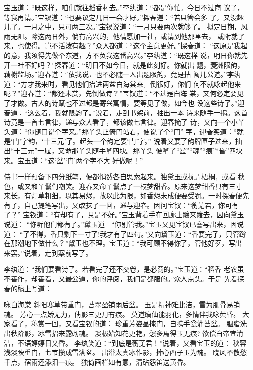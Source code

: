 宝玉道：“既这样，咱们就往稻香村去。”李纨道：“都是你忙。今日不过商
议了，等我再请。”宝钗道：“也要议定几日一会才好。”探春道：“若只管会多
了，又没趣儿了。一月之中，只可两三次。”宝钗说道：“一月只要两次就够了。
拟定日期，风雨无阻。除这两日外，倘有高兴的，他情愿加一社，或请到他那里去，
或附就了来，也使得。岂不活泼有趣？”众人都道：“这个主意更好。”探春道：
“这原是我起的意，我须得先做个东道，方不负我这番高兴。”李纨道：“既这样
说，明日你就先开一社不好吗？”探春道：“明日不如今日，就是此刻好。你就出
题，菱洲限韵，藕榭监场。”迎春道：“依我说，也不必随一人出题限韵，竟是拈
阄儿公道。”李纨道：“方才我来时，看见他们抬进两盆白海棠来，倒很好，你们
何不就咏起他来呢？”迎春道：“都还未赏，先倒做诗？”宝钗道：“不过是白海
棠，又何必定要见了才做。古人的诗赋也不过都是寄兴寓情，要等见了做，如今也
没这些诗了。”迎春道：“这么着，我就限韵了。”说着，走到书架前，抽出一本
诗来随手一揭。这首诗竟是一首七言律，递与众人看了，都该做七言律。迎春掩了
诗，又向一个小丫头道：“你随口说个字来。”那丫头正倚门站着，便说了个“门”
字，迎春笑道：“就是‘门’字韵，‘十三元’了。起头一个韵定要‘门’字。”
说着又要了韵牌匣子过来，抽出“十三元”一屉，又命那丫头随手拿四块。那丫头
便拿了“盆”“魂”“痕”“昏”四块来。宝玉道：“这‘盆’‘门’两个字不大
好做呢！”

侍书一样预备下四分纸笔，便都悄然各自思索起来。独黛玉或抚弄梧桐，或看
秋色，或又和丫鬟们嘲笑。迎春又命丫鬟点了一枝梦甜香。原来这梦甜香只有三寸
来长，有灯草粗细，以其易烬，故以此为限，如香烬未成便要受罚。一时探春便先
有了，自己提笔写出，又改抹了一回，递与迎春。因问宝钗：“蘅芜君，你可有了？”
宝钗道：“有却有了，只是不好。”宝玉背着手在回廊上踱来踱去，因向黛玉说道：
“你听他们都有了。”黛玉道：“你别管我。”宝玉又见宝钗已誊写出来，因说道：
“了不得，香只剩下一寸了!我才有了四句。”又向黛玉道：“香要完了，只管蹲
在那潮地下做什么？”黛玉也不理。宝玉道：“我可顾不得你了，管他好歹，写出
来罢。”说着，走到案前写了。

李纨道：“我们要看诗了。若看完了还不交卷，是必罚的。”宝玉道：“稻香
老农虽不善作，却善看，又最公道，你的评阅，我们是都服的。”众人点头。于是
先看探春的稿上写道：

咏白海棠
斜阳寒草带重门，苔翠盈铺雨后盆。
玉是精神难比洁，雪为肌骨易销魂。
芳心一点娇无力，倩影三更月有痕。
莫道缟仙能羽化，多情伴我咏黄昏。
大家看了，称赏一回，又看宝钗的道：
珍重芳姿昼掩门，自携手瓮灌苔盆。
胭脂洗出秋阶影，冰雪招来露砌魂。
淡极始知花更艳，愁多焉得玉无痕?
欲偿白帝宜清洁，不语婷婷日又昏。
李纨笑道：“到底是蘅芜君！”说着，又看宝玉的道：
秋容浅淡映重门，七节攒成雪满盆。
出浴太真冰作影，捧心西子玉为魂。
晓风不散愁千点，宿雨还添泪一痕。
独倚画栏如有意，清砧怨笛送黄昏。

